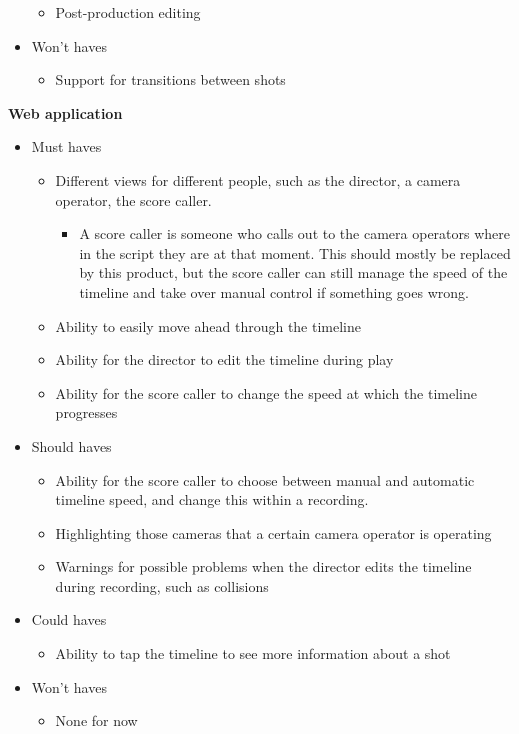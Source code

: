 \begin{itemize}
\begin{itemize}
\begin{itemize}
\end{itemize}
\item Post-production editing
\end{itemize}
\item Won't haves
\begin{itemize}
\item Support for transitions between shots
\end{itemize}
\end{itemize}
\begin{large}
\textbf{Web application}
\end{large}
\begin{itemize}
\item Must haves
\begin{itemize}
\item Different views for different people, such as the director, a camera operator, the score caller.
\begin{itemize}
\item A score caller is someone who calls out to the camera operators where in the script they are at that moment. This should mostly be replaced by this product, but the score caller can still manage the speed of the timeline and take over manual control if something goes wrong.
\end{itemize}
\item Ability to easily move ahead through the timeline
\item Ability for the director to edit the timeline during play
\item Ability for the score caller to change the speed at which the timeline progresses
\end{itemize}
\item Should haves
\begin{itemize}
\item Ability for the score caller to choose between manual and automatic timeline speed, and change this within a recording.
\item Highlighting those cameras that a certain camera operator is operating
\item Warnings for possible problems when the director edits the timeline during recording, such as collisions
\end{itemize}
\item Could haves
\begin{itemize}
\item Ability to tap the timeline to see more information about a shot
\end{itemize}
\item Won't haves
\begin{itemize}
\item None for now
\end{itemize}
\end{itemize}
